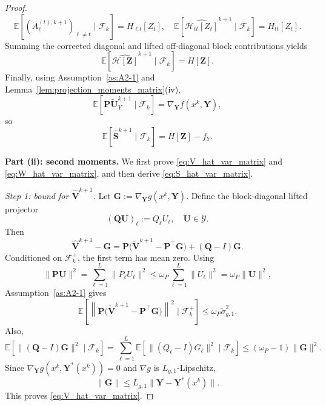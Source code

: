\documentclass{pkumelon}
\theoremstyle{plain}
\newcommand{\E}{\mathbb{E}}
\begin{document}
\begin{proof}
\begin{equation*}
\E[(A_\ell^{(t),k+1})_{\ell\neq t}\mid \mathcal F_k]=H_{\ell t}[Z_t], \quad \E[\widehat{\mathcal H_{tt}[Z_t]}^{k+1}\mid \mathcal F_k]=H_{tt}[Z_t].
\end{equation*}
Summing the corrected diagonal and lifted off-diagonal block contributions yields
\begin{equation}\label{eq:EHhat_multilayer_active}
\E[\widehat{\mathcal H[\boldsymbol Z]}^{k+1}\mid \mathcal F_k]
=
H[\boldsymbol Z].
\end{equation}
Finally, using Assumption~\ref{as:A2-1} and Lemma~\ref{lem:projection_moments_matrix}(iv),
\begin{equation*}
\E[\boldsymbol P\tilde{\boldsymbol U}_Y^{k+1}\mid \mathcal F_k] = \nabla_{\boldsymbol Y}f(x^k,\boldsymbol Y),
\end{equation*}
so
\begin{equation*}
\E[\widehat{\boldsymbol S}^{k+1}\mid \mathcal F_k] = H[\boldsymbol Z]-f_Y.
\end{equation*}

\textbf{Part (ii): second moments. }
We first prove \eqref{eq:V_hat_var_matrix} and \eqref{eq:W_hat_var_matrix}, and then derive \eqref{eq:S_hat_var_matrix}.

\emph{Step 1: bound for $\widehat{\boldsymbol V}^{k+1}$.} Let $\boldsymbol G:=\nabla_{\boldsymbol Y}g(x^k,\boldsymbol Y)$. Define the block-diagonal lifted projector
\begin{equation*}
(\boldsymbol Q\boldsymbol U)_\ell:=Q_\ell U_\ell,\quad \boldsymbol U\in\mathcal Y.
\end{equation*}
Then
\begin{equation*}
\widehat{\boldsymbol V}^{k+1}-\boldsymbol G = \boldsymbol P\bigl(\tilde{\boldsymbol V}^{k+1}-\boldsymbol P^\top\boldsymbol G\bigr) +(\boldsymbol Q-I)\boldsymbol G.
\end{equation*}
Conditioned on $\mathcal F_k^+$, the first term has mean zero. Using
\begin{equation*}
\|\boldsymbol P\boldsymbol U\|^2 = \sum_{\ell=1}^L \|P_\ell U_\ell\|^2 \le \omega_P\sum_{\ell=1}^L \|U_\ell\|^2 = \omega_P\|\boldsymbol U\|^2,
\end{equation*}
Assumption~\ref{as:A2-1} gives
\begin{equation*}
\E\!\left[\left\|\boldsymbol P\bigl(\tilde{\boldsymbol V}^{k+1}-\boldsymbol P^\top\boldsymbol G\bigr)\right\|^2\mid \mathcal F_k^+\right] \le \omega_P \tilde\sigma_{g,1}^2.
\end{equation*}
Also,
\begin{equation*}
\E[\|(\boldsymbol Q-I)\boldsymbol G\|^2\mid \mathcal F_k] = \sum_{\ell=1}^L \E[\|(Q_\ell-I)G_\ell\|^2\mid \mathcal F_k] \le (\omega_P-1)\|\boldsymbol G\|^2.
\end{equation*}
Since $\nabla_{\boldsymbol Y}g(x^k,\boldsymbol Y^*(x^k))=0$ and $\nabla g$ is $L_{g,1}$-Lipschitz,
\begin{equation*}
\|\boldsymbol G\| \le L_{g,1}\|\boldsymbol Y-\boldsymbol Y^*(x^k)\|.
\end{equation*}
This proves \eqref{eq:V_hat_var_matrix}.


\end{proof}
\end{document}
